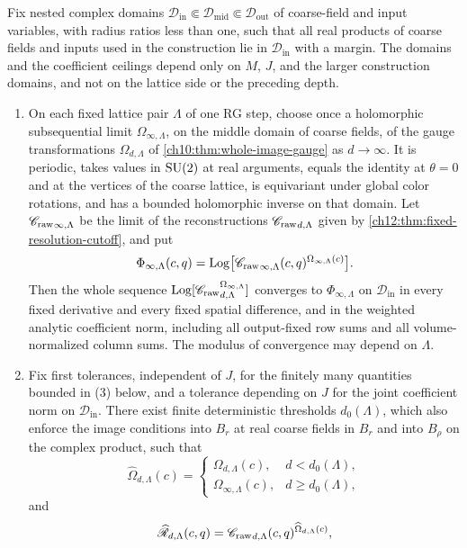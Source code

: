 \begin{theorem}\label{ch12:thm:replacement-family}
Fix nested complex domains $\mathscr D_{\mathrm{in}}\Subset\mathscr D_{\mathrm{mid}}\Subset\mathscr D_{\mathrm{out}}$ of coarse-field and input variables, with radius ratios less than one, such that all real products of coarse fields and inputs used in the construction lie in $\mathscr D_{\mathrm{in}}$ with a margin. The domains and the coefficient ceilings depend only on $M$, $J$, and the larger construction domains, and not on the lattice side or the preceding depth.
\begin{enumerate}
\item On each fixed lattice pair $\Lambda$ of one RG step, choose once a holomorphic subsequential limit $\Omega_{\infty,\Lambda}$, on the middle domain of coarse fields, of the gauge transformations $\Omega_{d,\Lambda}$ of \cref{ch10:thm:whole-image-gauge} as $d\to\infty$. It is periodic, takes values in $\mathrm{SU}(2)$ at real arguments, equals the identity at $\theta=0$ and at the vertices of the coarse lattice, is equivariant under global color rotations, and has a bounded holomorphic inverse on that domain. Let ${\mathscr C_{\mathrm{raw}}}_{\infty,\Lambda}$ be the limit of the reconstructions ${\mathscr C_{\mathrm{raw}}}_{d,\Lambda}$ given by \cref{ch12:thm:fixed-resolution-cutoff}, and put
\[
 \Phi_{\infty,\Lambda}(c,q)=\operatorname{Log}\bigl[{\mathscr C_{\mathrm{raw}}}_{\infty,\Lambda}(c,q)^{\Omega_{\infty,\Lambda}(c)}\bigr].
\]
Then the whole sequence $\operatorname{Log}[{\mathscr C_{\mathrm{raw}}}_{d,\Lambda}^{\Omega_{\infty,\Lambda}}]$ converges to $\Phi_{\infty,\Lambda}$ on $\mathscr D_{\mathrm{in}}$ in every fixed derivative and every fixed spatial difference, and in the weighted analytic coefficient norm, including all output-fixed row sums and all volume-normalized column sums. The modulus of convergence may depend on $\Lambda$.
\item Fix first tolerances, independent of $J$, for the finitely many quantities bounded in (3) below, and a tolerance depending on $J$ for the joint coefficient norm on $\mathscr D_{\mathrm{in}}$. There exist finite deterministic thresholds $d_0(\Lambda)$, which also enforce the image conditions into $B_r$ at real coarse fields in $B_r$ and into $B_\rho$ on the complex product, such that
\[
 \widehat\Omega_{d,\Lambda}(c)=
 \begin{cases}\Omega_{d,\Lambda}(c),&d<d_0(\Lambda),\\ \Omega_{\infty,\Lambda}(c),&d\ge d_0(\Lambda),\end{cases}
\]
and
\[
 \widehat{\mathscr R}_{d,\Lambda}(c,q)={\mathscr C_{\mathrm{raw}}}_{d,\Lambda}(c,q)^{\widehat\Omega_{d,\Lambda}(c)},
\]
\end{enumerate}
\end{theorem}
